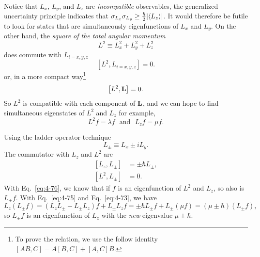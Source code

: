 Notice that $L_x$, $L_y$, and $L_z$ are \textit{incompatible} observables, the generalized uncertainty principle indicates that $\sigma_{L_x} \sigma_{L_y} \geq \frac{\hbar}{2} \abs{\expval{L_{z}}}$.
It would therefore be futile to look for states that are simultaneously eigenfunctions of $L_x$ and $L_y$.
On the other hand, the \textit{square of the total angular momentum}
\begin{equation}
  \label{eq:4-70}
  L^2 \equiv L_x^2 + L_y^2 + L_z^2
\end{equation}
does commute with $L_{i=x,y,z}$
\begin{equation}
  \label{eq:4-71}
  \left[ L^2, L_{i=x,y,z} \right] =0.
\end{equation}
or, in a more compact way\footnote{To prove the relation, we use the follow identity $\left[ AB,C \right] = A \left[ B,C \right] + \left[ A,C \right]B$.}
\begin{equation}
  \label{eq:4-72}
  \left[ L^2, \mathbf{L} \right] =0.
\end{equation}
So $L^2$ is compatible with each component of $\mathbf{L}$, and we can hope to find simultaneous eigenstates of $L^2$ and $L_z$ for example,
\begin{equation}
  \label{eq:4-73}
  L^2 f = \lambda f ~ ~ ~ \text{and} ~ ~ ~ L_z f = \mu f.
\end{equation}

Using the ladder operator technique
\begin{equation}
  \label{eq:4-74}
  L_{\pm} \equiv L_x \pm i L_{y}.
\end{equation}
The commutator with $L_z$ and $L^{2}$ are
\begin{align}
  \label{eq:4-75}
  \left[ L_z, L_{\pm} \right] &= \pm \hbar L_{\pm}, \\
  \label{eq:4-76}
  \left[ L^2, L_{\pm} \right] &=0.
\end{align}
With Eq.~\eqref{eq:4-76}, we know that if $f$ is an eigenfunction of $L^2$ and $L_z$, so also is $L_{\pm}f$.
With Eq.~\eqref{eq:4-75} and Eq.~\eqref{eq:4-73}, we have
\begin{equation}
  \label{eq:4-77}
  L_z \left( L_{\pm} f \right) = \left( L_z L_{\pm} - L_{\pm} L_z \right) f + L_{\pm} L_z f = \pm \hbar L_{\pm} f + L_{\pm} \left( \mu f \right) = \left( \mu \pm \hbar \right) \left( L_{\pm} f \right),
\end{equation}
so $L_{\pm} f$ is an eigenfunction of $L_z$ with the \textit{new} eigenvalue $\mu \pm \hbar$.

